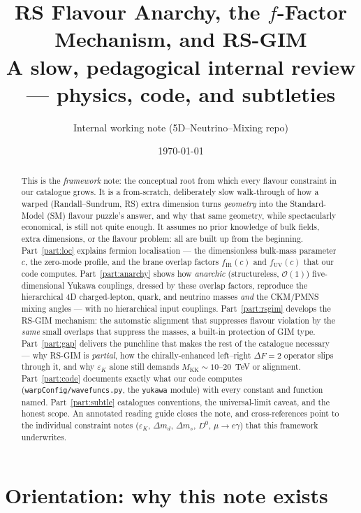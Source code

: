 \documentclass[11pt]{article}
\title{\bf RS Flavour Anarchy, the $f$-Factor Mechanism, and RS-GIM\\[4pt]
\large A slow, pedagogical internal review --- physics, code, and subtleties}
\author{Internal working note (5D--Neutrino--Mixing repo)}
\date{\today}
\newcommand{\MKK}{M_{\mathrm{KK}}}
\newcommand{\fIR}{f_{\mathrm{IR}}}
\newcommand{\fUV}{f_{\mathrm{UV}}}
\newcommand{\epsK}{\varepsilon_K}
\newcommand{\code}[1]{\texttt{#1}}
\theoremstyle{definition}
\begin{document}
\maketitle

\begin{abstract}
\noindent
This is the \emph{framework} note: the conceptual root from which every flavour
constraint in our catalogue grows. It is a from-scratch, deliberately slow
walk-through of how a warped (Randall--Sundrum, RS) extra dimension turns
\emph{geometry} into the Standard-Model (SM) flavour puzzle's answer, and why that
same geometry, while spectacularly economical, is still not quite enough. It
assumes no prior knowledge of bulk fields, extra dimensions, or the flavour
problem: all are built up from the beginning. Part~\ref{part:loc} explains
fermion localisation --- the dimensionless bulk-mass parameter $c$, the
zero-mode profile, and the brane overlap factors $\fIR(c)$ and $\fUV(c)$ that our
code computes. Part~\ref{part:anarchy} shows how \emph{anarchic} (structureless,
$\mathcal{O}(1)$) five-dimensional Yukawa couplings, dressed by these overlap
factors, reproduce the hierarchical 4D charged-lepton, quark, and neutrino masses
\emph{and} the CKM/PMNS mixing angles --- with no hierarchical input couplings.
Part~\ref{part:rsgim} develops the RS-GIM mechanism: the automatic alignment that
suppresses flavour violation by the \emph{same} small overlaps that suppress the
masses, a built-in protection of GIM type. Part~\ref{part:gap} delivers the
punchline that makes the rest of the catalogue necessary --- why RS-GIM is
\emph{partial}, how the chirally-enhanced left--right $\Delta F=2$ operator slips
through it, and why $\epsK$ alone still demands $\MKK\sim10$--$20$~TeV or
alignment. Part~\ref{part:code} documents exactly what our code computes
(\code{warpConfig/wavefuncs.py}, the \code{yukawa} module) with every constant and
function named. Part~\ref{part:subtle} catalogues conventions, the universal-limit
caveat, and the honest scope. An annotated reading guide closes the note, and
cross-references point to the individual constraint notes ($\epsK$, $\Delta m_d$,
$\Delta m_s$, $D^0$, $\mu\to e\gamma$) that this framework underwrites.
\end{abstract}

\tableofcontents

\part*{Orientation: why this note exists}
\end{document}
